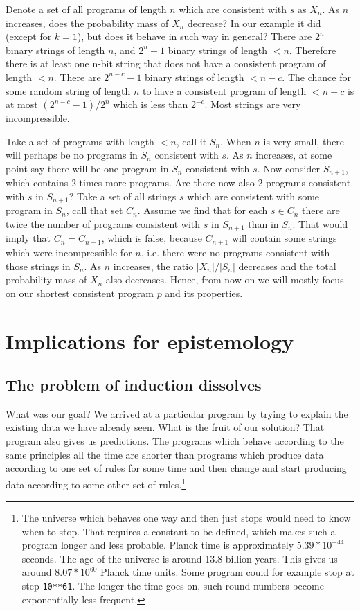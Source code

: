 Denote a set of all programs of length $n$ which are consistent with $s$ as $X_n$.
As $n$ increases, does the probability mass of $X_n$ decrease?
In our example it did (except for $k=1$), but does it behave in such way in general?
There are $2^n$ binary strings of length $n$, and $2^n-1$ binary strings of length $<n$.
Therefore there is at least one n-bit string that does not have a consistent program of length $<n$.
There are $2^{n-c}-1$ binary strings of length $<n-c$.
The chance for some random string of length $n$ to have a consistent program of length $<n-c$ is at most $(2^{n-c}-1)/2^n$ which is less than $2^{-c}$.
Most strings are very incompressible.

Take a set of programs with length $<n$, call it $S_n$.
When $n$ is very small, there will perhaps be no programs in $S_n$ consistent with $s$.
As $n$ increases, at some point say there will be one program in $S_n$ consistent with $s$.
Now consider $S_{n+1}$, which contains 2 times more programs.
Are there now also 2 programs consistent with $s$ in $S_{n+1}$?
Take a set of all strings $s$ which are consistent with some program in $S_n$, call that set $C_n$.
Assume we find that for each $s \in C_n$ there are twice the number of programs consistent with $s$ in $S_{n+1}$ than in $S_n$.
That would imply that $C_n = C_{n+1}$, which is false, because $C_{n+1}$ will contain some strings which were incompressible for $n$, i.e. there were no programs consistent with those strings in $S_n$.
As $n$ increases, the ratio $|X_n|/|S_n|$ decreases and the total probability mass of $X_n$ also decreases.
Hence, from now on we will mostly focus on our shortest consistent program $p$ and its properties.

\newpage

\section{Implications for epistemology}

\subsection{The problem of induction dissolves}

What was our goal?
We arrived at a particular program by trying to explain the existing data we have already seen.
What is the fruit of our solution?
That program also gives us predictions.
The programs which behave according to the same principles all the time are shorter than programs which produce data according to one set of rules for some time and then change and start producing data according to some other set of rules.\footnote{
The universe which behaves one way and then just stops would need to know when to stop.
That requires a constant to be defined, which makes such a program longer and less probable.
Planck time is approximately $5.39 * 10^{−44}$ seconds.
The age of the universe is around 13.8 billion years.
This gives us around $8.07 * 10^{60}$ Planck time units.
Some program could for example stop at step \texttt{10**61}.
The longer the time goes on, such round numbers become exponentially less frequent.
}

